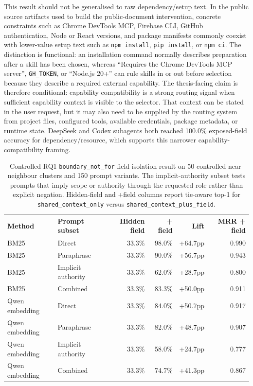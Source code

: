 This result should not be generalised to raw dependency/setup text. In the public source artifacts used to build the public-document intervention, concrete constraints such as Chrome DevTools MCP, Firebase CLI, GitHub authentication, Node or React versions, and package manifests commonly coexist with lower-value setup text such as \texttt{npm install}, \texttt{pip install}, or \texttt{npm ci}. The distinction is functional: an installation command normally describes preparation after a skill has been chosen, whereas ``Requires the Chrome DevTools MCP server'', \texttt{GH\_TOKEN}, or ``Node.js 20+'' can rule skills in or out before selection because they describe a required external capability. The thesis-facing claim is therefore conditional: capability compatibility is a strong routing signal when sufficient capability context is visible to the selector. That context can be stated in the user request, but it may also need to be supplied by the routing system from project files, configured tools, available credentials, package metadata, or runtime state. DeepSeek and Codex subagents both reached 100.0\% exposed-field accuracy for dependency/resource, which supports this narrower capability-compatibility framing.

\begin{table}[H]
\centering
\scriptsize
\setlength{\tabcolsep}{2pt}
\begin{tabular}{p{}p{}rrrr}
\toprule
Method & Prompt subset & Hidden field & + field & Lift & MRR + field \\
\midrule
BM25 & Direct & 33.3\% & 98.0\% & +64.7pp & 0.990 \\
BM25 & Paraphrase & 33.3\% & 90.0\% & +56.7pp & 0.943 \\
BM25 & Implicit authority & 33.3\% & 62.0\% & +28.7pp & 0.800 \\
BM25 & Combined & 33.3\% & 83.3\% & +50.0pp & 0.911 \\
Qwen embedding & Direct & 33.3\% & 84.0\% & +50.7pp & 0.917 \\
Qwen embedding & Paraphrase & 33.3\% & 82.0\% & +48.7pp & 0.907 \\
Qwen embedding & Implicit authority & 33.3\% & 58.0\% & +24.7pp & 0.777 \\
Qwen embedding & Combined & 33.3\% & 74.7\% & +41.3pp & 0.867 \\
\bottomrule
\end{tabular}
\caption{Controlled RQ1 \texttt{boundary\_not\_for} field-isolation result on 50 controlled near-neighbour clusters and 150 prompt variants. The implicit-authority subset tests prompts that imply scope or authority through the requested role rather than explicit negation. Hidden-field and +field columns report tie-aware top-1 for \texttt{shared\_context\_only} versus \texttt{shared\_context\_plus\_field}.}
\label{tab:rq1a-boundary-not-for-isolation}
\end{table}

